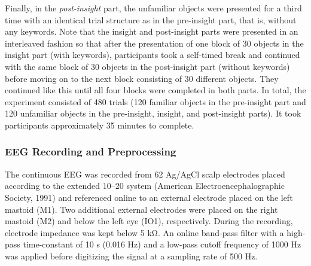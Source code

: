 \documentclass[
  english,
  man,floatsintext]{apa7}
\begin{document}
Finally, in the \emph{post-insight} part, the unfamiliar objects were presented for a third time with an identical trial structure as in the pre-insight part, that is, without any keywords. Note that the insight and post-insight parts were presented in an interleaved fashion so that after the presentation of one block of 30 objects in the insight part (with keywords), participants took a self-timed break and continued with the same block of 30 objects in the post-insight part (without keywords) before moving on to the next block consisting of 30 different objects. They continued like this until all four blocks were completed in both parts. In total, the experiment consisted of 480 trials (120 familiar objects in the pre-insight part and 120 unfamiliar objects in the pre-insight, insight, and post-insight parts). It took participants approximately 35 minutes to complete.

\hypertarget{eeg-recording-and-preprocessing}{%
\subsubsection{EEG Recording and Preprocessing}\label{eeg-recording-and-preprocessing}}

The continuous EEG was recorded from 62 Ag/AgCl scalp electrodes placed according to the extended 10--20 system (American Electroencephalographic Society, 1991) and referenced online to an external electrode placed on the left mastoid (M1). Two additional external electrodes were placed on the right mastoid (M2) and below the left eye (IO1), respectively. During the recording, electrode impedance was kept below 5 kΩ. An online band-pass filter with a high-pass time-constant of 10 s (0.016 Hz) and a low-pass cutoff frequency of 1000 Hz was applied before digitizing the signal at a sampling rate of 500 Hz.
\end{document}
